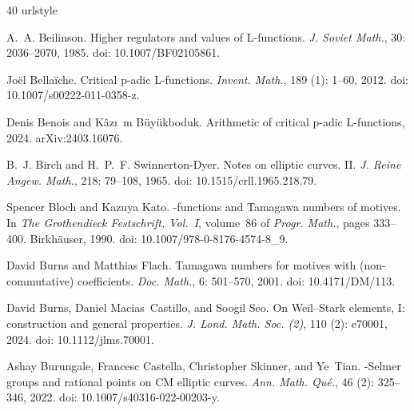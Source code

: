 \documentclass[11pt]{article}
\theoremstyle{definition}
\begin{document}
\clearpage
\begingroup
\raggedright
\small

\begin{thebibliography}{40}
\providecommand{\natexlab}[1]{#1}
\providecommand{\url}[1]{\texttt{#1}}
\expandafter\ifx\csname urlstyle\endcsname\relax
  \providecommand{\doi}[1]{doi: #1}\else
  \providecommand{\doi}{doi: \begingroup \urlstyle{rm}\Url}\fi

A.~A. Beilinson.
\newblock Higher regulators and values of {L}-functions.
\newblock \emph{J. Soviet Math.}, 30: 2036--2070, 1985.
\newblock \doi{10.1007/BF02105861}.

Jo\"el Bella\"iche.
\newblock Critical p-adic {L}-functions.
\newblock \emph{Invent. Math.}, 189 (1): 1--60, 2012.
\newblock \doi{10.1007/s00222-011-0358-z}.

Denis Benois and K\^az\i~m B\"uy\"ukboduk.
\newblock Arithmetic of critical p-adic {L}-functions, 2024.
\newblock arXiv:2403.16076.

B.~J. Birch and H.~P.~F. Swinnerton-Dyer.
\newblock Notes on elliptic curves. {II}.
\newblock \emph{J. Reine Angew. Math.}, 218: 79--108, 1965.
\newblock \doi{10.1515/crll.1965.218.79}.

Spencer Bloch and Kazuya Kato.
-functions and {T}amagawa numbers of motives.
\newblock In \emph{The {Grothendieck} {Festschrift}, Vol.~I}, volume~86 of \emph{Progr. Math.}, pages 333--400. Birkh\"auser, 1990.
\newblock \doi{10.1007/978-0-8176-4574-8_9}.

David Burns and Matthias Flach.
\newblock Tamagawa numbers for motives with (non-commutative) coefficients.
\newblock \emph{Doc. Math.}, 6: 501--570, 2001.
\newblock \doi{10.4171/DM/113}.

David Burns, Daniel Macias~Castillo, and Soogil Seo.
\newblock On {Weil--Stark} elements, {I}: construction and general properties.
\newblock \emph{J. Lond. Math. Soc. (2)}, 110 (2): e70001, 2024.
\newblock \doi{10.1112/jlms.70001}.

Ashay Burungale, Francesc Castella, Christopher Skinner, and Ye~Tian.
-{Selmer} groups and rational points on {CM} elliptic curves.
\newblock \emph{Ann. Math. Qu\'e.}, 46 (2): 325--346, 2022.
\newblock \doi{10.1007/s40316-022-00203-y}.


\end{thebibliography}
\end{document}
